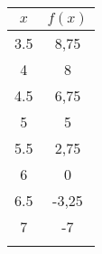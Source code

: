 \documentclass[12pt]{article}
\begin{document}
\begin{exercice}
\begin{enumerate}
\begin{multicols}{2}
\begin{enumerate}
\begin{multicols}{2}
                \begin{tabular}{|c|c|}
                  \hline
                  $x$ & $f(x)$ \\
                  \hline
                  3.5 & 8,75 \\
                  \hline
                  4 & 8 \\
                  \hline
                  4.5 & 6,75 \\
                  \hline
                  5 & 5 \\
                  \hline
                  5.5 & 2,75 \\
                  \hline
                  6 & 0 \\
                  \hline
                  6.5 & -3,25 \\
                  \hline
                  7 & -7 \\
                  \hline
                  &\\
                  \hline
                \end{tabular}
            \end{multicols}
      \end{enumerate}
            \end{multicols}


\end{enumerate}
\end{exercice}
\end{document}
